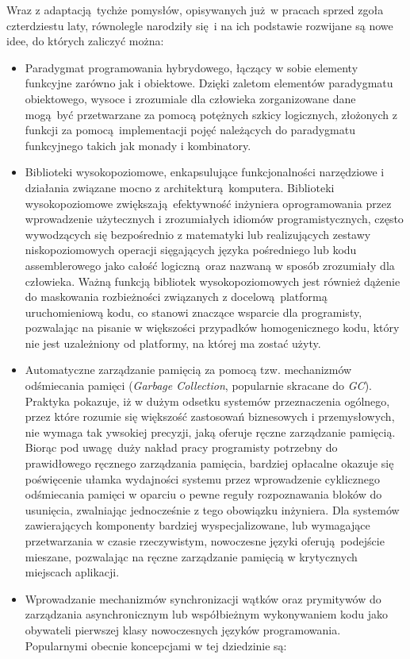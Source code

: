 \par{
Wraz z adaptacją tychże pomysłów, opisywanych już w pracach sprzed zgoła czterdziestu laty, równolegle narodziły się i na ich podstawie rozwijane są nowe idee, do których zaliczyć można:
\begin{itemize}
  \item Paradygmat programowania hybrydowego, łączący w sobie elementy funkcyjne zarówno jak i obiektowe. Dzięki zaletom elementów paradygmatu obiektowego, wysoce i zrozumiale dla człowieka zorganizowane dane mogą być przetwarzane za pomocą potężnych szkicy logicznych, złożonych z funkcji za pomocą implementacji pojęć należących do paradygmatu funkcyjnego takich jak monady i kombinatory.
  \item Biblioteki wysokopoziomowe, enkapsulujące funkcjonalności narzędziowe i działania związane mocno z architekturą komputera. Biblioteki wysokopoziomowe zwiększają efektywność inżyniera oprogramowania przez wprowadzenie użytecznych i zrozumiałych idiomów programistycznych, często wywodzących się bezpośrednio z matematyki lub realizujących zestawy niskopoziomowych operacji sięgających języka pośredniego lub kodu assemblerowego jako całość logiczną oraz nazwaną w sposób zrozumiały dla człowieka. Ważną funkcją bibliotek wysokopoziomowych jest również dążenie do maskowania rozbieżności związanych z docelową platformą uruchomieniową kodu, co stanowi znaczące wsparcie dla programisty, pozwalając na pisanie w większości przypadków homogenicznego kodu, który nie jest uzależniony od platformy, na której ma zostać użyty.
  \item Automatyczne zarządzanie pamięcią za pomocą tzw. mechanizmów odśmiecania pamięci (\emph{Garbage Collection}, popularnie skracane do \emph{GC}). Praktyka pokazuje, iż w dużym odsetku systemów przeznaczenia ogólnego, przez które rozumie się większość zastosowań biznesowych i przemysłowych, nie wymaga tak ywsokiej precyzji, jaką oferuje ręczne zarządzanie pamięcią. Biorąc pod uwagę duży nakład pracy programisty potrzebny do prawidłowego ręcznego zarządzania pamięcia, bardziej opłacalne okazuje się poświęcenie ułamka wydajności systemu przez wprowadzenie cyklicznego odśmiecania pamięci w oparciu o pewne reguły rozpoznawania bloków do usunięcia, zwalniając jednocześnie z tego obowiązku inżyniera. Dla systemów zawierających komponenty bardziej wyspecjalizowane, lub wymagające przetwarzania w czasie rzeczywistym, nowoczesne języki oferują podejście mieszane, pozwalając na ręczne zarządzanie pamięcią w krytycznych miejscach aplikacji.
  \item Wprowadzanie mechanizmów synchronizacji wątków oraz prymitywów do zarządzania asynchronicznym lub współbieżnym wykonywaniem kodu jako obywateli pierwszej klasy nowoczesnych języków programowania. Popularnymi obecnie koncepcjami w tej dziedzinie są:

\end{itemize}}

